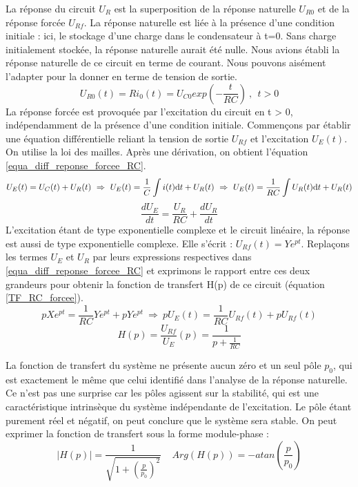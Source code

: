 \documentclass[]{book}
\begin{document}
{	La réponse du circuit $U_{R}$ est la superposition de la réponse naturelle $U_{R0}$ et de la réponse forcée $U_{Rf}$. La réponse naturelle est liée à la présence d'une condition initiale : ici, le stockage d'une charge dans le condensateur à t=0. Sans charge initialement stockée, la réponse naturelle aurait été nulle. Nous avions établi la réponse naturelle de ce circuit en terme de courant. Nous pouvons aisément l'adapter pour la donner en terme de tension de sortie.
	\begin{equation*}\label{}
	U_{R0}(t)=Ri_{0}(t)=U_{C0}exp(-\frac{t}{RC})~,~~t>0
	\end{equation*}
	La réponse forcée est provoquée par l'excitation du circuit en t > 0, indépendamment de la présence d'une condition initiale. Commençons par établir une équation différentielle reliant la tension de sortie $U_{Rf}$ et l'excitation $U_{E}(t)$. On utilise la loi des mailles. Après une dérivation, on obtient l'équation \ref{equa_diff_reponse_forcee_RC}.
	\begin{equation*}\label{}
	U_{E}(t)=U_{C}(t)+U_{R}(t) ~ \Rightarrow ~ U_{E}(t)=\frac{1}{C}\int i(t) \mathrm{d} t+U_{R}(t)~ \Rightarrow ~U_{E}(t)=\frac{1}{RC}\int U_{R}(t) \mathrm{d} t+U_{R}(t)
	\end{equation*} 
	\begin{equation}\label{equa_diff_reponse_forcee_RC}
	\frac{dU_{E}}{dt}=\frac{U_{R}}{RC}+\frac{dU_{R}}{dt}
	\end{equation}
	L'excitation étant de type exponentielle complexe et le circuit linéaire, la réponse est aussi de type exponentielle complexe. Elle s'écrit : $U_{Rf}(t)=Ye^{pt}$. Replaçons les termes $U_{E}$ et $U_{R}$ par leurs expressions respectives dans \ref{equa_diff_reponse_forcee_RC} et exprimons le rapport entre ces deux grandeurs pour obtenir la fonction de transfert H(p) de ce circuit (équation \ref{TF_RC_forcee}).
	\begin{equation*}
	pXe^{pt}=\frac{1}{RC} Ye^{pt}+pYe^{pt} ~\Rightarrow~pU_{E}(t)=\frac{1}{RC}U_{Rf}(t)+pU_{Rf}(t)
	\end{equation*}
	\begin{equation}\label{TF_RC_forcee}
	H(p)=\frac{U_{Rf}}{U_{E}}(p)=\frac{1}{p+\frac{1}{RC}}
	\end{equation}

	La fonction de transfert du système ne présente aucun zéro et un seul pôle $p_{0}$, qui est exactement le même que celui identifié dans l'analyse de la réponse naturelle. Ce n'est pas une surprise car les pôles agissent sur la stabilité, qui est une caractéristique intrinsèque du système indépendante de l'excitation. Le pôle étant purement réel et négatif, on peut conclure que le système sera stable. On peut exprimer la fonction de transfert sous la forme module-phase :
	\begin{equation*}
	|H(p)|=\frac{1}{\sqrt{1+(\frac{p}{p_{0}})^{2}}}~~~~~Arg(H(p))=-atan(\frac{p}{p_{0}})
	\end{equation*}
	
}
\end{document}
